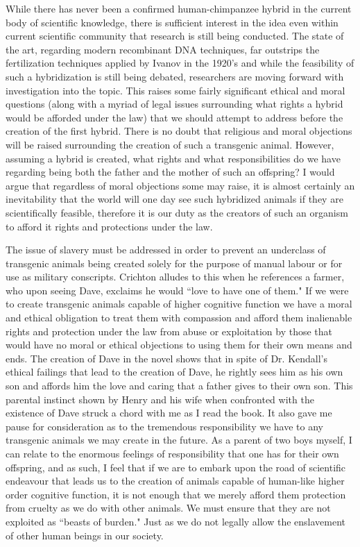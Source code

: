 \documentclass[letterpaper,10pt,twoside]{article}
\begin{document}
While there has never been a confirmed human-chimpanzee hybrid in the current body of scientific knowledge, there is sufficient interest in the idea even within current scientific community that research is still being conducted.  The state of the art, regarding modern recombinant DNA techniques, far outstrips the fertilization techniques applied by Ivanov in the 1920's and while the feasibility of such a hybridization is still being debated, researchers are moving forward with investigation into the topic.  This raises some fairly significant ethical and moral questions (along with a myriad of legal issues surrounding what rights a hybrid would be afforded under the law) that we should attempt to address before the creation of the first hybrid.  There is no doubt that religious and moral objections will be raised surrounding the creation of such a transgenic animal.  However, assuming a hybrid is created, what rights and what responsibilities do we have regarding being both the father and the mother of such an offspring?  I would argue that regardless of moral objections some may raise, it is almost certainly an inevitability that the world will one day see such hybridized animals if they are scientifically feasible, therefore it is our duty as the creators of such an organism to afford it rights and protections under the law.

The issue of slavery must be addressed in order to prevent an underclass of transgenic animals being created solely for the purpose of manual labour or for use as military conscripts.  Crichton alludes to this when he references a farmer, who upon seeing Dave, exclaims he would ``love to have one of them."  If we were to create transgenic animals capable of higher cognitive function we have a moral and ethical obligation to treat them with compassion and afford them inalienable rights and protection under the law from abuse or exploitation by those that would have no moral or ethical objections to using them for their own means and ends.  The creation of Dave in the novel shows that in spite of Dr. Kendall's ethical failings that lead to the creation of Dave, he rightly sees him as his own son and affords him the love and caring that a father gives to their own son.  This parental instinct shown by Henry and his wife when confronted with the existence of Dave struck a chord with me as I read the book.  It also gave me pause for consideration as to the tremendous responsibility we have to any transgenic animals we may create in the future.  As a parent of two boys myself, I can relate to the enormous feelings of responsibility that one has for their own offspring, and as such, I feel that if we are to embark upon the road of scientific endeavour that leads us to the creation of animals capable of human-like higher order cognitive function, it is not enough that we merely afford them protection from cruelty as we do with other animals.  We must ensure that they are not exploited as ``beasts of burden."  Just as we do not legally allow the enslavement of other human beings in our society.
\end{document}
